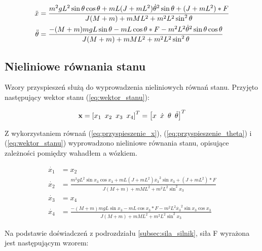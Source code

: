 \documentclass[12pt]{article}
\numberwithin{equation}{section}
\begin{document}
\begin{align}
\Ddot{x} &= \frac{m^{2}gL^{2}\sin{\theta}\cos{\theta} + mL(J + mL^{2})\dot{\theta}^{2}\sin{\theta} + (J+ mL^{2}) * F}{J(M + m) + mML^{2} + m^{2}L^{2}\sin^{2}{\theta}} \label{eq:przyspieszenie_x} \\
    \Ddot{\theta} &= \frac{-(M + m)mgL\sin{\theta} - mL\cos{\theta}*F - m^{2}L^{2}\dot{\theta}^{2}\sin{\theta}\cos{\theta}}{J(M + m) + mML^{2} + m^{2}L^{2}\sin^{2}{\theta}} \label{eq:przyspieszenie_theta}
\end{align}

\subsection{Nieliniowe równania stanu}

Wzory przyspieszeń służą do wyprowadzenia nieliniowych równań stanu. Przyjęto następujący wektor stanu (\ref{eq:wektor_stanu}):

\begin{equation}
    \textbf{x} = \left[x_{1} \hspace{5px} x_{2} \hspace{5px} x_{3} \hspace{5px} x_{4}\right]^T = \left[x \hspace{5px} \dot{x} \hspace{5px} \theta \hspace{5px} \dot{\theta}\right]^T \label{eq:wektor_stanu}
\end{equation}

Z wykorzystaniem równań (\ref{eq:przyspieszenie_x}), (\ref{eq:przyspieszenie_theta}) i (\ref{eq:wektor_stanu}) wyprowadzono nieliniowe równania stanu, opisujące zależności pomiędzy wahadłem a wózkiem.

\begin{align}
    \dot{x_{1}} &= x_{2} \\
    \dot{x_{2}} &= \frac{m^{2}gL^{2}\sin{x_{3}}\cos{x_{3}} + mL(J + mL^{2})\dot{x_{3}}^{2}\sin{x_{3}} + (J+ mL^{2}) * F}{J(M + m) + mML^{2} + m^{2}L^{2}\sin^{2}{x_{3}}} \\
    \dot{x_{3}} &= x_{4} \\
    \dot{x_{4}} & = \frac{-(M + m)mgL\sin{x_{3}} - mL\cos{x_{3}}*F - m^{2}L^{2}\dot{x_{3}}^{2}\sin{x_{3}}\cos{x_{3}}}{J(M + m) + mML^{2} + m^{2}L^{2}\sin^{2}{x_{3}}}
\end{align}

Na podstawie doświadczeń z podrozdziału \ref{subsec:sila_silnik}, siła F wyrażona jest następującym wzorem: 
\end{document}
